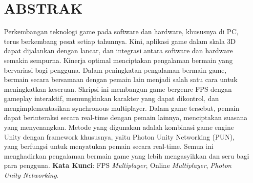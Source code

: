 \chapter*{ABSTRAK}
\noindent
Perkembangan teknologi game pada software dan hardware, khususnya di PC, terus berkembang pesat setiap tahunnya. Kini, aplikasi game dalam skala 3D dapat dijalankan dengan lancar, dan integrasi antara software dan hardware semakin sempurna. Kinerja optimal menciptakan pengalaman bermain yang bervariasi bagi pengguna. Dalam peningkatan pengalaman bermain game, bermain secara bersamaan dengan pemain lain menjadi salah satu cara untuk meningkatkan keseruan. Skripsi ini membangun game bergenre FPS dengan gameplay interaktif, memungkinkan karakter yang dapat dikontrol, dan mengimplementasikan synchronous multiplayer. Dalam game tersebut, pemain dapat berinteraksi secara real-time dengan pemain lainnya, menciptakan suasana yang menyenangkan. Metode yang digunakan adalah kombinasi game engine Unity dengan framework khususnya, yaitu Photon Unity Networking (PUN), yang berfungsi untuk menyatukan pemain secara real-time. Semua ini menghadirkan pengalaman bermain game yang lebih mengasyikkan dan seru bagi para pengguna.
\newline
\noindent \textbf{Kata Kunci}: FPS \textit{Multiplayer}, Online \textit{Multiplayer}, \textit{Photon Unity Networking}.